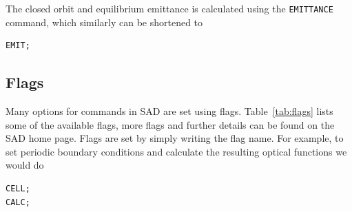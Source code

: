 \documentclass{article}
\begin{document}
The closed orbit and equilibrium emittance is calculated using the \texttt{EMITTANCE} command, which similarly can be shortened to
\begin{lstlisting}
EMIT;
\end{lstlisting}


\subsection{Flags}
Many options for commands in SAD are set using flags. Table~\ref{tab:flags} lists some of the available flags, more flags and further details can be found on the SAD home page.
Flags are set by simply writing the flag name. For example, to set periodic boundary conditions and calculate the resulting optical functions we would do
\begin{lstlisting}
CELL;
CALC;
\end{lstlisting}
%
\end{document}
